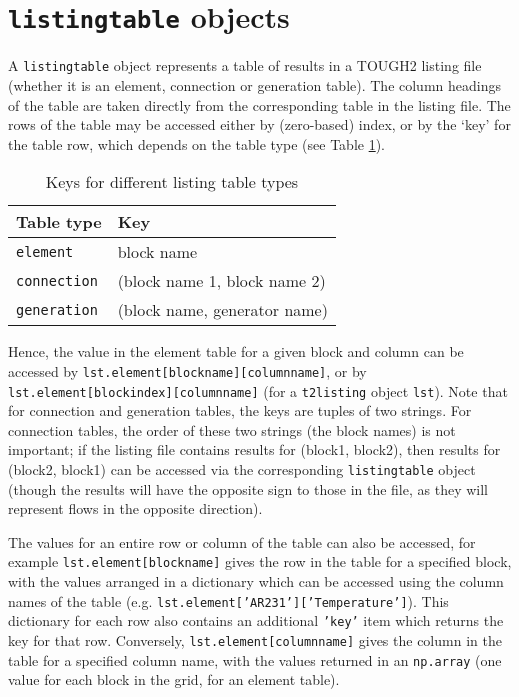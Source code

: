 \section{\texttt{listingtable} objects}
\label{listingtableobjects}

A \texttt{listingtable} object represents a table of results in a TOUGH2 listing file (whether it is an element, connection or generation table).  The column headings of the table are taken directly from the corresponding table in the listing file.  The rows of the table may be accessed either by (zero-based) index, or by the `key' for the table row, which depends on the table type (see Table \ref{tb:listing_table_keys}).

\begin{table}[h]
  \begin{center}
    \begin{tabular}{|l|l|}
      \hline
      \textbf{Table type} & \textbf{Key}\\
      \hline
      \texttt{element} & block name\\
      \texttt{connection} & (block name 1, block name 2)\\
      \texttt{generation} & (block name, generator name)\\
      \hline
    \end{tabular}
    \caption{Keys for different listing table types}
    \label{tb:listing_table_keys}
  \end{center}
\end{table}

Hence, the value in the element table for a given block and column can be accessed by \texttt{lst.element[blockname][columnname]}, or by \texttt{lst.element[blockindex][columnname]} (for a \texttt{t2listing} object \texttt{lst}).  Note that for connection and generation tables, the keys are tuples of two strings.  For connection tables, the order of these two strings (the block names) is not important; if the listing file contains results for (block1, block2), then results for (block2, block1) can be accessed via the corresponding \texttt{listingtable} object (though the results will have the opposite sign to those in the file, as they will represent flows in the opposite direction).

The values for an entire row or column of the table can also be accessed, for example \texttt{lst.element[blockname]} gives the row in the table for a specified block, with the values arranged in a dictionary which can be accessed using the column names of the table (e.g. \texttt{lst.element['AR231']['Temperature']}).  This dictionary for each row also contains an additional \texttt{'key'} item which returns the key for that row.  Conversely, \texttt{lst.element[columnname]} gives the column in the table for a specified column name, with the values returned in an \texttt{np.array} (one value for each block in the grid, for an element table).

